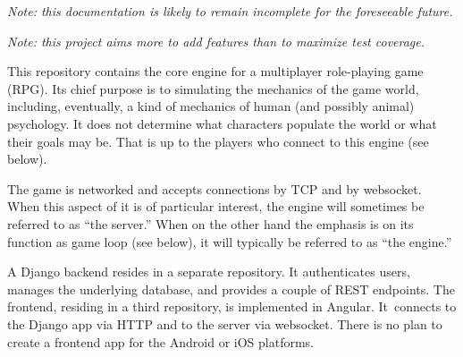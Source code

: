{\em \small Note: this documentation is likely to remain incomplete
for the foreseeable future.}

\noindent
{\em \small Note: this project aims more to add features than to maximize
test coverage.}

\bigskip

This repository contains the core engine for a multiplayer role-playing game
(RPG).
Its chief purpose is to simulating the mechanics of the game world, including,
eventually, a kind of mechanics of human (and possibly animal) psychology.
It does not determine what characters populate the world or what their goals
may be.
That is up to the players who connect to this engine (see below).

The game is networked and accepts connections by TCP and by websocket.
When this aspect of it is of particular interest, the engine will sometimes be
referred to as ``the server.''
When on the other hand the emphasis is on its function as game loop (see below),
it will typically be referred to as ``the engine.''

A Django backend resides in a separate repository.
It authenticates users, manages the underlying database, and provides a couple
of REST endpoints.
The frontend, residing in a third repository, is implemented in Angular.
It~connects to the Django app via HTTP and to the server via websocket.
There is no plan to create a frontend app for the Android or iOS platforms.
